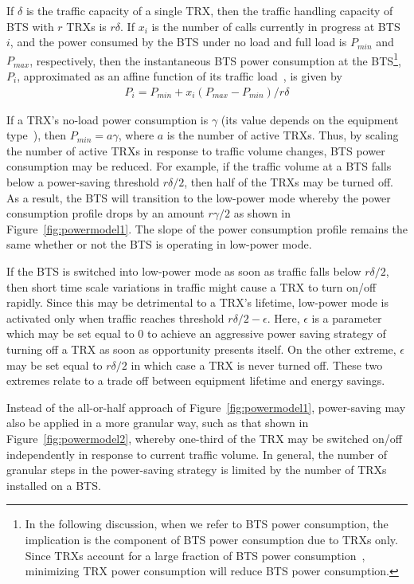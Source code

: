 If $\delta$ is the traffic capacity of a single TRX, then the traffic handling capacity of BTS with $r$ TRXs is $r\delta$. If $x_i$ is the number of calls currently in progress at BTS $i$, and the power consumed by the BTS under no load and full load is $P_{min}$ and $P_{max}$, respectively, then the instantaneous BTS power consumption at the BTS\footnote{In the following discussion, when we refer to BTS power consumption, the implication is the component of BTS power consumption due to TRXs only. Since TRXs account for a large fraction of BTS power consumption~\cite{Lorincz:BTS-Measure:Sensors:2012}, minimizing TRX power consumption will reduce BTS power consumption.}, $P_i$, approximated as an affine function of its traffic load~\cite{Peng:2011:BTSSaving:Mobicom}, is given by
\begin{align}
P_i = P_{min} + x_i(P_{max}-P_{min})/r\delta\label{eq:btspower}
\end{align}

If a TRX's no-load power consumption is $\gamma$ (its value depends on the equipment type~\cite{Lorincz:BTS-Measure:Sensors:2012,flexibsc}), then $P_{min}=a\gamma$, where $a$ is the number of active TRXs.
Thus, by scaling the number of active TRXs in response to traffic volume changes, BTS power consumption may be reduced.
For example, if the traffic volume at a BTS falls below a power-saving threshold $r\delta/2$, then half of the TRXs may be turned off.
As a result, the BTS will transition to the low-power mode whereby the power consumption profile drops by an amount $r\gamma/2$ as shown in Figure~\ref{fig:powermodel1}. The slope of the power consumption profile remains the same whether or not the BTS is operating in low-power mode. 

If the BTS is switched into low-power mode as soon as traffic falls below $r\delta/2$, then short time scale variations in traffic might cause a TRX to turn on/off rapidly. Since this may be detrimental to a TRX's lifetime, low-power mode is activated only when traffic reaches threshold $r\delta/2-\epsilon$. Here, $\epsilon$ is a parameter which may be set equal to 0 to achieve an aggressive power saving strategy of turning off a TRX as soon as opportunity presents itself. On the other extreme, $\epsilon$ may be set equal to $r\delta/2$ in which case a TRX is never turned off. These two extremes relate to a trade
off between equipment lifetime and energy savings.

Instead of the all-or-half approach of Figure~\ref{fig:powermodel1}, power-saving may also be applied in a more granular way, such as that shown in Figure~\ref{fig:powermodel2}, whereby one-third of the TRX may be switched on/off independently in response to current traffic volume. In general, the number of granular steps in the power-saving strategy is limited by the number of TRXs installed on a BTS.

